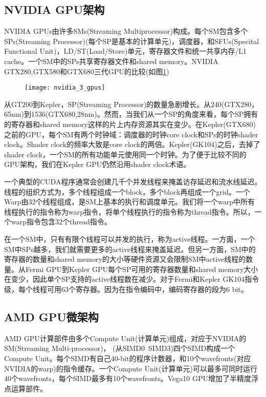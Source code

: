 \subsection{NVIDIA GPU架构}
NVIDIA GPUs由许多SMs(Streaming Multiprocessor)构成。每个SM包含多个SPs(Streaming Processor)(每个SP是基本的计算单元)，调度器，和SFUs(Specital Functional Unit)，LD/ST(Load/Store)单元，寄存器文件和统一共享内存/L1 cache。一个SM中的SPs共享寄存器文件和shared memory。NVIDIA GTX280,GTX580和GTX680三代GPU的比较(如图\ref{fig:nvidia_3_gpus})
\begin{figure}[htbp]
	\centering
	\texttt{[image: nvidia\_3\_gpus]}
	\label{fig:nvidia_3_gpus}
\end{figure}
从GT200到Kepler，SP(Streaming Processor)的数量急剧增长。从240(GTX280，65nm)到1536(GTX680,28nm)。然而，当我们从一个SP的角度来看，每个SP拥有的寄存器和shared memory这样的片上内存资源其实在变少。在Kepler(GTX680)之前的GPU，每个SM有两个时钟域：调度器的时钟core clock和SPs的时钟shader clock。Shader clock的频率大致是core clock的两倍。Kepler(GK104)之后，去掉了shader clock，一个SM的所有功能单元使用同一个时钟。为了便于比较不同的GPU架构，我们在Kepler GPU仍然沿用shader clock术语。

一个典型的CUDA程序通常会创建几千个并发线程来掩盖访存延迟和流水线延迟。线程的组织方式为，多个线程组成一个block，多个block再组成一个grid。一个Warp由32个线程组成，是SM上基本的执行和调度单元。我们将一个warp中所有线程执行的指令称为warp指令，将单个线程执行的指令称为thread指令。所以，一个warp指令包含32个thread指令。

在一个SM中，只有有限个线程可以并发的执行，称为active线程。一方面，一个SM中SPs越多，我们就需要更多的active线程来掩盖延迟。但另一方面，SM中的寄存器的数量和shared memory的大小等硬件资源又会限制SM中active线程的数量。从Fermi GPU到Kepler GPU每个SP可用的寄存器数量和shared memory大小在变少，因此单个SP支持的active线程数在减少。对于Fermi和Kepler GK104指令级，每个线程可用63个寄存器。因为在指令编码中，编码寄存器的段为6 bit。

\subsection{AMD GPU微架构}
 AMD GPU计算部件由多个Compute Unit(计算单元)组成，对应于NVIDIA的SM(Streaming Multi-processor)， (从SIMD0~SIMD3)四个SIMD构成一个Compute Unit。每个SIMD有自己40-bit的程序计数器，和10个wavefronts(对应NVIDIA的warp)的指令缓存。一个Compute Unit(计算单元)可以最多可同时运行40个wavefronts，每个SIMD最多有10个wavefronts。Vega10 GPU增加了半精度浮点运算部件。



